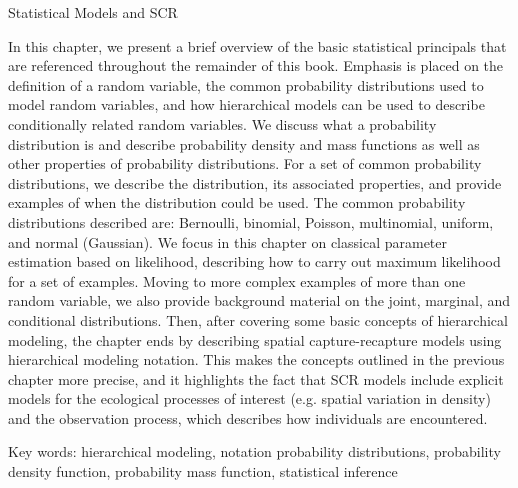 Statistical Models and SCR

In this chapter, we present a brief overview of the basic statistical
principals that are referenced throughout the remainder of this
book. Emphasis is placed on the definition of a random variable, the
common probability distributions used to model random variables, and
how hierarchical models can be used to describe conditionally related
random variables.  We discuss what a probability distribution is and
describe probability density and mass functions as well as other properties of
probability distributions.  For a set of common probability
distributions, we describe the distribution, its associated
properties, and provide examples of when the distribution could be
used.  The common probability distributions described are: 
Bernoulli, binomial, Poisson, multinomial, uniform, and normal (Gaussian).  We
focus in this chapter on classical parameter 
estimation based on likelihood, describing how to carry out maximum likelihood for a set
of examples.  Moving to more complex examples of more than one random
variable, we also provide background material on the joint, marginal,
and conditional distributions.  Then, after covering some basic
concepts of hierarchical modeling, the chapter ends by describing
spatial capture-recapture models using hierarchical modeling
notation. This makes the concepts outlined in the previous chapter
more precise, and it highlights the fact that SCR models include
explicit models for the ecological processes of interest (e.g. spatial
variation in density) and the observation process, which describes how
individuals are encountered.

Key words: 
hierarchical modeling, 
notation 
probability distributions, 
probability density function, probability mass function,
statistical inference
